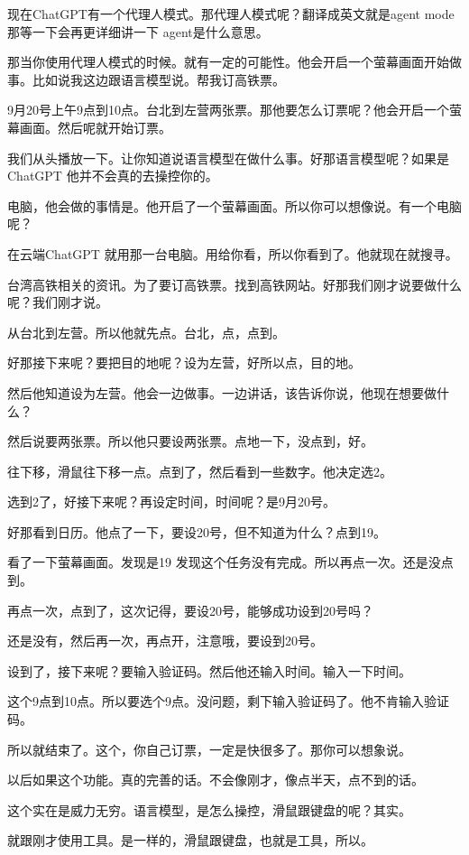 \documentclass[12pt,a4paper]{article}
\begin{document}
现在ChatGPT有一个代理人模式。那代理人模式呢？翻译成英文就是agent mode 那等一下会再更详细讲一下 agent是什么意思。

那当你使用代理人模式的时候。就有一定的可能性。他会开启一个萤幕画面开始做事。比如说我这边跟语言模型说。帮我订高铁票。

9月20号上午9点到10点。台北到左营两张票。那他要怎么订票呢？他会开启一个萤幕画面。然后呢就开始订票。

我们从头播放一下。让你知道说语言模型在做什么事。好那语言模型呢？如果是ChatGPT 他并不会真的去操控你的。

电脑，他会做的事情是。他开启了一个萤幕画面。所以你可以想像说。有一个电脑呢？

在云端ChatGPT 就用那一台电脑。用给你看，所以你看到了。他就现在就搜寻。

台湾高铁相关的资讯。为了要订高铁票。找到高铁网站。好那我们刚才说要做什么呢？我们刚才说。

从台北到左营。所以他就先点。台北，点，点到。

好那接下来呢？要把目的地呢？设为左营，好所以点，目的地。

然后他知道设为左营。他会一边做事。一边讲话，该告诉你说，他现在想要做什么？

然后说要两张票。所以他只要设两张票。点地一下，没点到，好。

往下移，滑鼠往下移一点。点到了，然后看到一些数字。他决定选2。

选到2了，好接下来呢？再设定时间，时间呢？是9月20号。

好那看到日历。他点了一下，要设20号，但不知道为什么？点到19。

看了一下萤幕画面。发现是19 发现这个任务没有完成。所以再点一次。还是没点到。

再点一次，点到了，这次记得，要设20号，能够成功设到20号吗？

还是没有，然后再一次，再点开，注意哦，要设到20号。

设到了，接下来呢？要输入验证码。然后他还输入时间。输入一下时间。

这个9点到10点。所以要选个9点。没问题，剩下输入验证码了。他不肯输入验证码。

所以就结束了。这个，你自己订票，一定是快很多了。那你可以想象说。

以后如果这个功能。真的完善的话。不会像刚才，像点半天，点不到的话。

这个实在是威力无穷。语言模型，是怎么操控，滑鼠跟键盘的呢？其实。

就跟刚才使用工具。是一样的，滑鼠跟键盘，也就是工具，所以。
\end{document}
